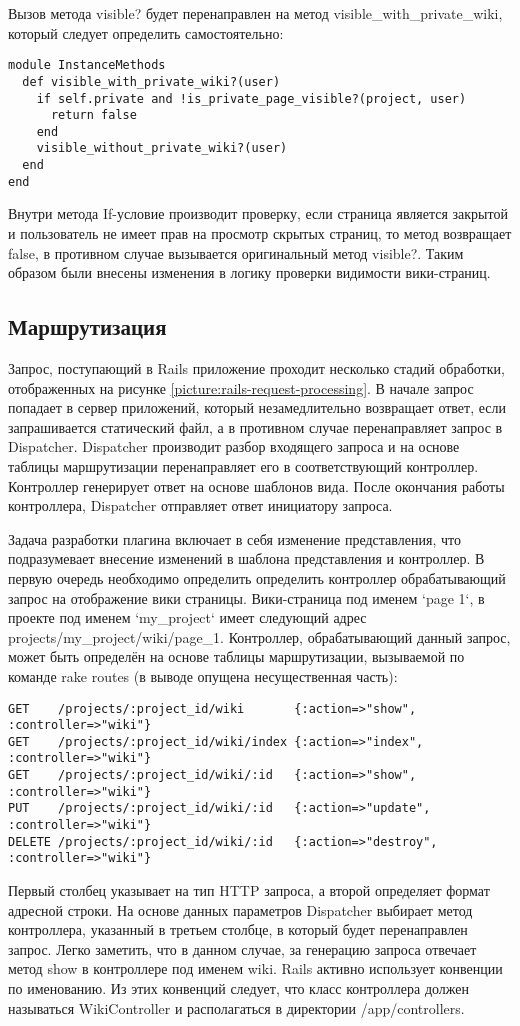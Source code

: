 Вызов метода visible? будет перенаправлен на метод
visible\_with\_private\_wiki, который следует определить
самостоятельно:
\small{\begin{lstlisting}
module InstanceMethods
  def visible_with_private_wiki?(user)  
    if self.private and !is_private_page_visible?(project, user)
      return false
    end
    visible_without_private_wiki?(user)
  end
end
\end{lstlisting}}
Внутри метода If-условие производит проверку, если страница является закрытой и
пользователь не имеет прав на просмотр скрытых страниц, то метод возвращает
false, в противном случае вызывается оригинальный метод visible?. Таким образом
были внесены изменения в логику проверки видимости вики-страниц.

\subsection{Маршрутизация}
\label{section:routing}
Запрос, поступающий в Rails приложение проходит несколько стадий обработки,
отображенных на рисунке \ref{picture:rails-request-processing}.
В начале запрос попадает в сервер приложений, который незамедлительно возвращает
ответ, если запрашивается статический файл, а в противном случае перенаправляет
запрос в Dispatcher. Dispatcher производит разбор входящего запроса и на основе
таблицы маршрутизации перенаправляет его в соответствующий контроллер.
Контроллер генерирует ответ на основе шаблонов вида. После окончания работы
контроллера, Dispatcher отправляет ответ инициатору запроса. 


Задача разработки плагина включает в себя изменение представления, что
подразумевает внесение изменений в шаблона представления и контроллер. В первую
очередь необходимо определить определить контроллер обрабатывающий запрос на
отображение вики страницы. Вики-страница под именем `page 1`, в проекте под
именем `my\_project` имеет следующий адрес projects/my\_project/wiki/page\_1.
Контроллер, обрабатывающий данный запрос, может быть определён на основе
таблицы маршрутизации, вызываемой по команде rake routes (в выводе опущена
несущественная часть):
\small{\begin{lstlisting}
GET    /projects/:project_id/wiki       {:action=>"show", :controller=>"wiki"}
GET    /projects/:project_id/wiki/index {:action=>"index", :controller=>"wiki"}
GET    /projects/:project_id/wiki/:id   {:action=>"show", :controller=>"wiki"}
PUT    /projects/:project_id/wiki/:id   {:action=>"update", :controller=>"wiki"}
DELETE /projects/:project_id/wiki/:id   {:action=>"destroy", :controller=>"wiki"}
\end{lstlisting}}
Первый столбец указывает на тип HTTP запроса, а второй определяет формат
адресной строки. На основе данных параметров Dispatcher выбирает метод
контроллера, указанный в третьем столбце, в который будет перенаправлен запрос.
Легко заметить, что в данном случае, за генерацию запроса отвечает метод show в
контроллере под именем wiki. Rails активно использует конвенции по именованию.
Из этих конвенций следует, что класс контроллера должен называться
WikiController и располагаться в директории /app/controllers.


